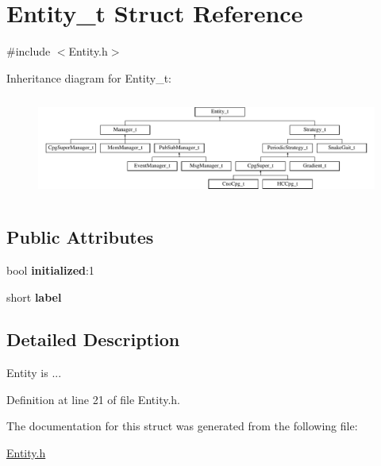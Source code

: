 \hypertarget{structEntity__t}{
\section{Entity\_\-t Struct Reference}
\label{structEntity__t}
}


{\ttfamily \#include $<$Entity.h$>$}

Inheritance diagram for Entity\_\-t:\begin{figure}[H]
\begin{center}
\leavevmode
\includegraphics[height=3.381642cm]{structEntity__t}
\end{center}
\end{figure}
\subsection*{Public Attributes}
\begin{DoxyCompactItemize}
\item 
\hypertarget{structEntity__t_ae557dee68a3b8eef6f8d960af3a322f0}{
bool {\bfseries initialized}:1}
\label{structEntity__t_ae557dee68a3b8eef6f8d960af3a322f0}

\item 
\hypertarget{structEntity__t_af89a8eab14338d075700a9d9f7425359}{
short {\bfseries label}}
\label{structEntity__t_af89a8eab14338d075700a9d9f7425359}

\end{DoxyCompactItemize}


\subsection{Detailed Description}
Entity is ... 

Definition at line 21 of file Entity.h.



The documentation for this struct was generated from the following file:\begin{DoxyCompactItemize}
\item 
\hyperlink{Entity_8h}{Entity.h}\end{DoxyCompactItemize}
